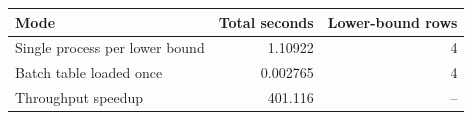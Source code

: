 {\small
\begin{tabular}{lrr}
\hline
Mode & Total seconds & Lower-bound rows \\
\hline
Single process per lower bound & 1.10922 & 4 \\
Batch table loaded once & 0.002765 & 4 \\
Throughput speedup & 401.116 & -- \\
\hline
\end{tabular}
}
